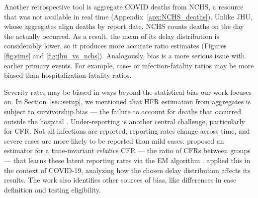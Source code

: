 \documentclass{article}
\begin{document}
Another retrospective tool is aggregate COVID deaths from NCHS, a resource that
was not available in real time (Appendix~\ref{apx:NCHS_deaths}). Unlike JHU,
whose aggregates align deaths by report date, NCHS counts deaths on the day the
actually occurred. As a result, the mean of its delay distribution is
considerably lower, so it produces more accurate ratio estimates (Figures
\ref{fig:sims} and \ref{fig:jhu_vs_nchs}). Analogously, bias is a more serious
issue with earlier primary events. For example, case- or infection-fatality
ratios may be more biased than hospitalization-fatality ratios. 

Severity rates may be biased in ways beyond the statistical bias our work
focuses on. 
In Section~\ref{sec:setup}, we mentioned that 
HFR estimation from aggregates is subject to survivorship bias --- 
the failure to account for deaths that occurred outside the hospital \citep{lipsitch2015potential}.
Under-reporting is another central challenge, particularly for CFR.
Not all infections are reported, reporting rates change across time, and severe
cases are more likely to be reported than mild cases.
\citet{reich2012estimating} proposed an estimator for a time-invariant
\textit{relative} CFR --- the ratio of CFRs between groups --- that learns these
latent reporting rates via the EM algorithm \citep{EM}. \citet{anastasios}
applied this in the context of COVID-19, analyzing how the chosen delay
distribution affects its results. The work also identifies other sources of bias, like
differences in case definition and testing eligibility.
\end{document}

